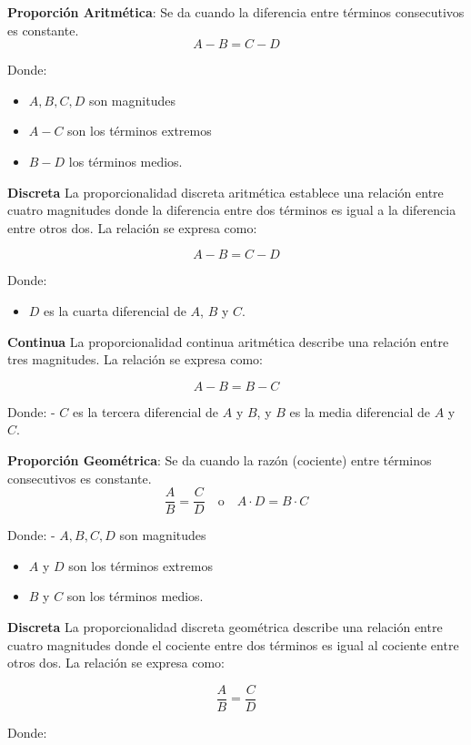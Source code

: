 \documentclass[
  stu,
  floatsintext,
  longtable,
  a4paper,
  nolmodern,
  notxfonts,
  notimes,
  colorlinks=true,linkcolor=blue,citecolor=blue,urlcolor=blue]{apa7}
\providecommand{\tightlist}{%
  \setlength{\itemsep}{0pt}\setlength{\parskip}{0pt}}
\begin{document}
\textbf{Proporción Aritmética}: Se da cuando la diferencia entre
términos consecutivos es constante. \[
  A - B = C - D
  \]

Donde:

\begin{itemize}
\item
  \(A, B, C, D\) son magnitudes
\item
  \(A-C\) son los términos extremos
\item
  \(B-D\) los términos medios.
\end{itemize}

\textbf{Discreta} La proporcionalidad discreta aritmética establece una
relación entre cuatro magnitudes donde la diferencia entre dos términos
es igual a la diferencia entre otros dos. La relación se expresa como:

\[
A - B = C - D
\]

Donde:

\begin{itemize}
\tightlist
\item
  \(D\) es la cuarta diferencial de \(A\), \(B\) y \(C\).
\end{itemize}

\textbf{Continua} La proporcionalidad continua aritmética describe una
relación entre tres magnitudes. La relación se expresa como:

\[
A - B = B - C
\]

Donde: - \(C\) es la tercera diferencial de \(A\) y \(B\), y \(B\) es la
media diferencial de \(A\) y \(C\).

\textbf{Proporción Geométrica}: Se da cuando la razón (cociente) entre
términos consecutivos es constante. \[
  \frac{A}{B} = \frac{C}{D} \quad \text{o} \quad A \cdot D = B \cdot C
  \]

Donde: - \(A, B, C, D\) son magnitudes

\begin{itemize}
\item
  \(A\) y \(D\) son los términos extremos
\item
  \(B\) y \(C\) son los términos medios.
\end{itemize}

\textbf{Discreta} La proporcionalidad discreta geométrica describe una
relación entre cuatro magnitudes donde el cociente entre dos términos es
igual al cociente entre otros dos. La relación se expresa como:

\[
\frac{A}{B} = \frac{C}{D}
\]

Donde:
\end{document}
